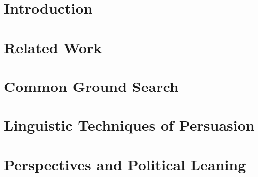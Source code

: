 \documentclass[12pt,lot, lof]{outhesis}
\newcommand{\statusgreen}{}%
\DeclareRobustCommand{\statusgreen}{%
      \textcolor{green}{\CheckmarkBold}
    }
\newcommand{\statusorange}{}%
\DeclareRobustCommand{\statusorange}{%
      \textcolor{orange}{\HandPencilLeft}
    }
\newcommand{\statusred}{}%
\DeclareRobustCommand{\statusred}{%
      \textcolor{red}{\XSolidBold}
    }
\newcommand{\statusgreen}{}%
\DeclareRobustCommand{\statusgreen}{}
\newcommand{\statusorange}{}%
\DeclareRobustCommand{\statusorange}{}
\newcommand{\statusred}{}%
\DeclareRobustCommand{\statusred}{}
\begin{document}
\listoftodos


\makefrontmatter







\chapter{\statusred Introduction}


\chapter{\statusred Related Work}


\chapter{\statusgreen Common Ground Search}


\chapter{\statusorange Linguistic Techniques of Persuasion}


\chapter{\statusred Perspectives and Political Leaning}

\end{document}
